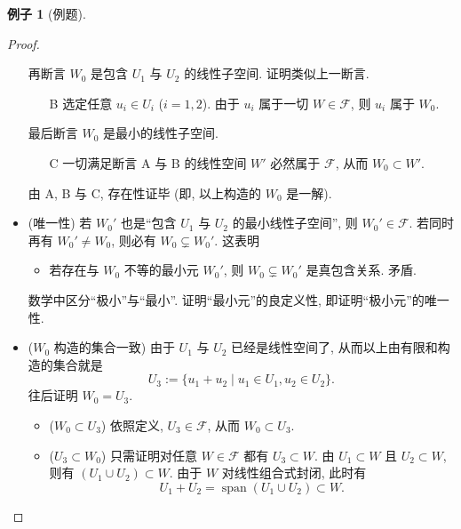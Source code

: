 \documentclass[11pt]{ctexart}
\theoremstyle{definition}
\numberwithin{equation}{section}
\theoremstyle{definition}
\newtheorem*{example}{例子}
\theoremstyle{remark}
\begin{document}
\begin{example}[例题]
\begin{proof}
\begin{itemize}
            再断言 $W_0$ 是包含 $U_1$ 与 $U_2$ 的线性子空间. 证明类似上一断言. 
            \begin{itemize}
                \item[B] 选定任意 $u_i\in U_i$ ($i=1,2$). 由于 $u_i$ 属于一切 $W\in \mathscr F$, 则 $u_i$ 属于 $W_0$. 
            \end{itemize}
            最后断言 $W_0$ 是最小的线性子空间. 
            \begin{itemize}
                \item[C] 一切满足断言 A 与 B 的线性空间 $W'$ 必然属于 $\mathscr F$, 从而 $W_0\subset W'$. 
            \end{itemize}
            由 A, B 与 C, 存在性证毕 (即, 以上构造的 $W_0$ 是一解). 
            \item (唯一性) 若 $W_0'$ 也是``包含 $U_1$ 与 $U_2$ 的最小线性子空间'', 则 $W_0'\in \mathscr F$. 若同时再有 $W_0'\neq W_0$, 则必有 $W_0\subsetneq W_0'$. 这表明
            \begin{itemize}
                \item 若存在与 $W_0$ 不等的最小元 $W_0'$, 则 $W_0\subsetneq W_0'$ 是真包含关系. 矛盾. 
            \end{itemize}
            \begin{pinked}
                数学中区分``极小''与``最小''. 证明``最小元''的良定义性, 即证明``极小元''的唯一性. 
            \end{pinked}
            \item ($W_0$ 构造的集合一致) 由于 $U_1$ 与 $U_2$ 已经是线性空间了, 从而以上由有限和构造的集合就是
            \begin{equation}
                U_3:=\{u_1+u_2\mid u_1\in U_1,u_2\in U_2\}. 
            \end{equation}
            往后证明 $W_0=U_3$. 
            \begin{itemize}
                \item ($W_0\subset U_3$) 依照定义, $U_3\in \mathscr F$, 从而 $W_0\subset U_3$. 
                \item ($U_3\subset W_0$) 只需证明对任意 $W\in \mathscr F$ 都有 $U_3\subset W$. 由 $U_1\subset W$ 且 $U_2\subset W$, 则有 $(U_1\cup U_2)\subset W$. 由于 $W$ 对线性组合式封闭, 此时有 
                \begin{equation}
                    U_1+U_2=\operatorname{span}(U_1\cup U_2)\subset W.
                \end{equation}
            \end{itemize}
        \end{itemize}
    \end{proof}
\end{example}
\end{document}
